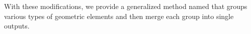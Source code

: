 \documentclass[10pt,journal,cspaper,compsoc]{IEEEtran}
\begin{document}
With these modifications, we provide a generalized method named  that groups various 
types of geometric elements and then merge each group into single outputs.


\end{document}
